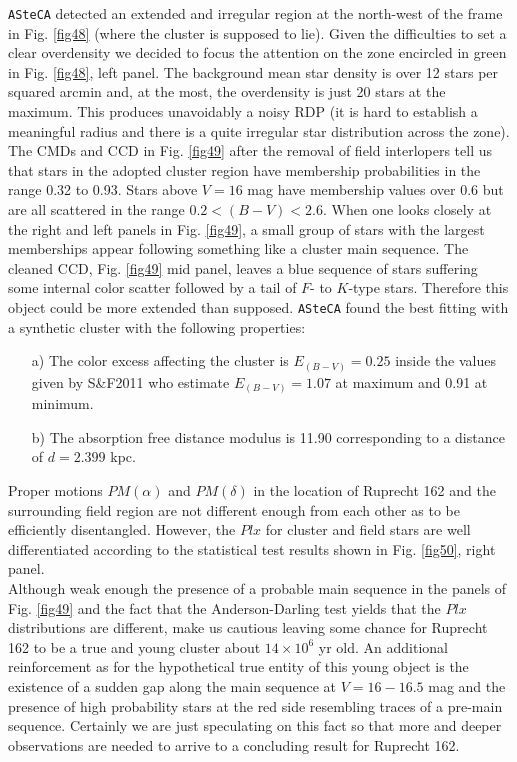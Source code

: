 \documentclass{aa}
\begin{document}
\texttt{ASteCA} detected an extended and irregular region at the north-west of
the frame in Fig. \ref{fig48} (where the cluster is supposed to lie). Given the
difficulties to set a clear overdensity we decided to focus the attention on the
zone encircled in green in Fig. \ref{fig48}, left panel. The background mean star
density is over 12 stars per squared arcmin and, at the most, the overdensity is
just 20 stars at the maximum. This produces unavoidably a noisy RDP (it is hard
to establish a meaningful radius and there is a quite irregular star
distribution across the zone).
The CMDs and CCD in Fig. \ref{fig49} after the removal of field interlopers tell
us that stars in the adopted cluster region have membership probabilities in the
range 0.32 to 0.93. Stars above $V=16$ mag have membership values over 0.6 but
are all scattered in the range $0.2<(B-V)<2.6$. When one looks closely at the
right and left panels in Fig. \ref{fig49}, a small group of stars with the
largest memberships appear following something like a cluster main sequence.
The cleaned CCD, Fig. \ref{fig49} mid panel, leaves a blue sequence of stars
suffering some internal color scatter followed by a tail of $F$- to $K$-type
stars. Therefore this object could be more extended than supposed. 
\texttt{ASteCA} found the best fitting with a synthetic cluster with the
following properties:

\begin{itemize}
\item [a)] The color excess affecting the cluster is $E_{(B-V)} = 0.25$ inside
    the values given by S\&F2011 who estimate $E_{(B-V)} = 1.07$ at
    maximum and 0.91 at minimum. 
\item [b)] The absorption free distance modulus is 11.90 corresponding to a
    distance of $d = 2.399$ kpc.
\end{itemize}

Proper motions $PM(\alpha)$ and $PM(\delta)$ in the location of Ruprecht 162 and
the surrounding field region are not different enough from each other as to be
efficiently disentangled. However, the $Plx$ for cluster and field stars are
well differentiated according to the statistical test results shown in Fig.
\ref{fig50}, right panel.\\

Although weak enough the presence of a probable main sequence in the 
panels of Fig. \ref{fig49} and the fact that the Anderson-Darling test
yields that the $Plx$ distributions are different, make us cautious
leaving some chance for Ruprecht 162 to be a true and young cluster about
$14\times10^6$ yr old. An additional reinforcement as for the hypothetical
true entity of this young object is the existence of a sudden gap along the
main sequence at $V = 16-16.5$ mag and the presence of high probability
stars at the red side resembling traces of a pre-main sequence. Certainly we
are just speculating on this fact so that more and deeper observations are
needed to arrive to a concluding result for Ruprecht 162.
\end{document}
